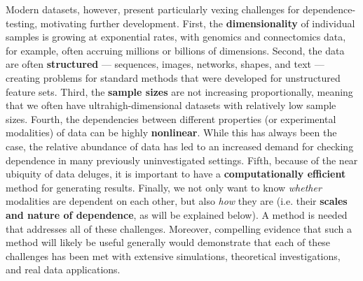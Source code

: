 \documentclass[11pt]{article}
\newcommand{\note}[2][]{\added[#1,remark={#2}]{}}
\newcommand{\cs}[1]{{\note{cs: #1}}}
\begin{document}
Modern datasets, however, present particularly vexing challenges for dependence-testing, motivating further development.
%
First, the \textbf{dimensionality} of individual samples is growing at exponential rates, with genomics and connectomics data, for example, often accruing millions or billions of dimensions. 
Second, the data are often \textbf{structured} --- sequences, images, networks, shapes, and text --- creating problems for standard methods that were developed for unstructured feature sets.
%
Third, the \textbf{sample sizes} are not increasing proportionally, meaning that we often have ultrahigh-dimensional datasets with relatively low sample sizes.
% 
Fourth, the dependencies between different properties (or experimental modalities) of data can be highly \textbf{nonlinear}.  While this has always been the case, the relative abundance of data has led to an increased demand for checking dependence in many previously uninvestigated settings.
%
Fifth, because of the near ubiquity of data deluges, it is important to have a  \textbf{computationally efficient} method for generating results.
%
Finally, we not only want to know \textit{whether}  modalities are dependent on each other, but also \textit{how} they are (i.e. their \textbf{scales and nature of dependence}, as will be explained below).
A method is needed that addresses all of these challenges. 
Moreover, compelling evidence that such a method will likely be useful generally would demonstrate that each of these challenges has been met with extensive simulations, theoretical investigations, and real data applications.
\cs{the last sentence reads strange within the paragraph; is that what you mean?}
\end{document}
